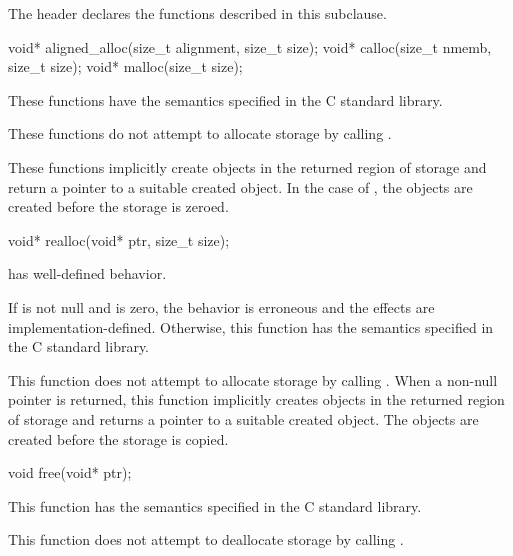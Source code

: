 \pnum
\begin{note}
The header 
declares the functions described in this subclause.
\end{note}

%
%
%
\begin{itemdecl}
void* aligned_alloc(size_t alignment, size_t size);
void* calloc(size_t nmemb, size_t size);
void* malloc(size_t size);
\end{itemdecl}

\begin{itemdescr}
\pnum
\effects
These functions have the semantics specified in the C standard library.

\pnum
\remarks
These functions do not attempt to allocate
storage by calling .

\pnum
These functions implicitly create objects
in the returned region of storage and
return a pointer to a suitable created object.
In the case of ,
the objects are created before the storage is zeroed.
\end{itemdescr}

%
\begin{itemdecl}
void* realloc(void* ptr, size_t size);
\end{itemdecl}

\begin{itemdescr}
\pnum
\expects
{} has well-defined behavior.

\pnum
\effects
If  is not null and  is zero,
the behavior is erroneous and the effects are implementation-defined.
Otherwise, this function has the semantics specified in the C standard library.

\pnum
\remarks
This function does not attempt to allocate storage
by calling .
When a non-null pointer is returned,
this function implicitly creates objects
in the returned region of storage and
returns a pointer to a suitable created object.
The objects are created before the storage is copied.
\end{itemdescr}

%
\begin{itemdecl}
void free(void* ptr);
\end{itemdecl}

\begin{itemdescr}
\pnum
\effects
This function has the semantics specified in the C standard library.

\pnum
\remarks
This function does not attempt to
deallocate storage by calling
.
\end{itemdescr}

